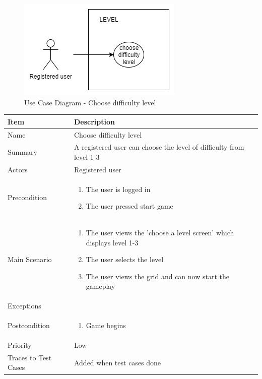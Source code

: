 \documentclass[12pt]{article}
\begin{document}
\begin{figure}[htbp]
    \centering
    \includegraphics[scale=0.6]{LevelDifficulty}
    \caption{Use Case Diagram - Choose difficulty level}
    \label{fig:LevelDifficulty}
\end{figure}

\begin{center}
\setlength{\tabcolsep}{18pt}
\renewcommand{\arraystretch}{1.3}
\begin{tabular}{ |p{3cm}|p{10cm}| }
    \hline
    \rowcolor{green}
   Item & Description \\
    \hline
    Name & Choose difficulty level \\
    \hline
    Summary & A registered user can choose the level of difficulty from level 1-3 \\
    \hline
    Actors & Registered user \\
    \hline
    Precondition & 
    \vspace*{-0.2in}
    \begin{enumerate}
        \item The user is logged in
        \item The user pressed start game
    \end{enumerate}  \\
    \hline
    Main Scenario &     
    \vspace*{-0.2in}
    \begin{enumerate}
        \item The user views the 'choose a level screen' which displays level 1-3
        \item The user selects the level
        \item The user views the grid and can now start the gameplay
    \end{enumerate}  \\
    \hline
    Exceptions &  \\
    \hline
    Postcondition & 
    \vspace*{-0.2in}
    \begin{enumerate}
        \item Game begins
    \end{enumerate}  \\
    \hline
    Priority & Low  \\
    \hline
    Traces to Test Cases & Added when test cases done  \\
    \hline
\end{tabular}
\end{center}
\end{document}
